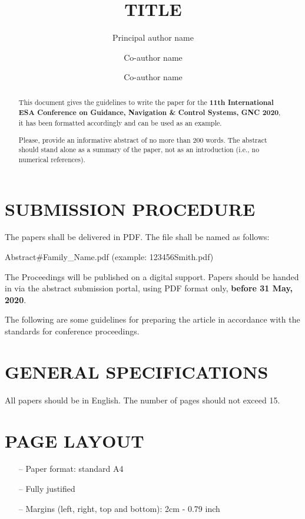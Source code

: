 \documentclass{esagnc}
\title{TITLE}
\author[(1)]{Principal author name}
\author[(1)]{Co-author name}
\author[(2)]{Co-author name}
\affil[(1)]{Affiliation, complete mailing address, phone, email}
\affil[(2)]{Affiliation, complete mailing address, phone, email}
\begin{document}
\maketitle

\begin{abstract}
This document gives the guidelines to write the paper for the \textbf{11th International ESA Conference on Guidance, Navigation \& Control Systems, GNC 2020}, it has been formatted accordingly and can be used as an example. 

Please, provide an informative abstract of no more than 200 words. The abstract should stand alone as a summary of the paper, not as an introduction (i.e., no numerical references). 

\end{abstract}

\section{SUBMISSION PROCEDURE}

The papers shall be delivered in PDF. The file shall be named as follows:

\begin{center}
Abstract\#Family\_Name.pdf (example: 123456Smith.pdf)
\end{center}

The Proceedings will be published on a digital support. Papers should be  handed in via the abstract submission portal, using PDF format only, \textbf{before 31 May, 2020}.

The following are some guidelines for preparing the article in accordance with the standards for conference proceedings. 

\section{GENERAL SPECIFICATIONS}

All papers should be in English. The number of pages should not exceed 15.

\section{PAGE LAYOUT}

\begin{itemize}
\item[--] Paper format: standard A4
\item[--] Fully justified
\item[--] Margins (left, right, top and bottom): 2cm - 0.79 inch
\end{itemize}
\end{document}
